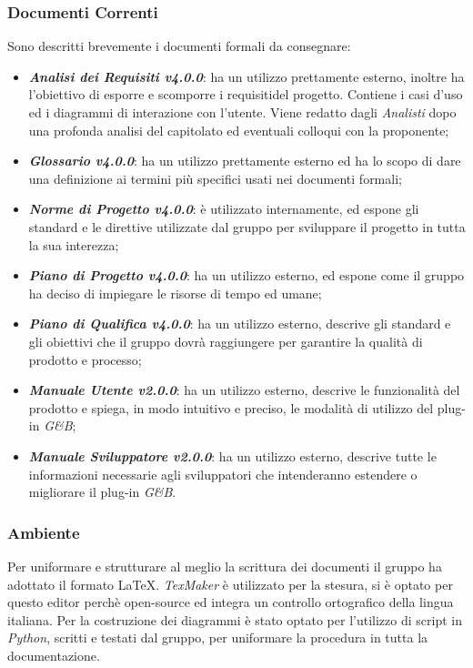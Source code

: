 \subsubsection{Documenti Correnti}
\label{ProcessiSupporto_Documentazione_DocumentiCorrenti}
Sono descritti brevemente i documenti formali da consegnare:
\begin{itemize}
	\item \textbf{\textit{Analisi dei Requisiti v4.0.0}}: ha un utilizzo prettamente esterno, inoltre ha l'obiettivo di esporre e scomporre i requisiti\glossario del progetto. Contiene i casi d'uso ed i diagrammi di interazione con l'utente. Viene redatto dagli \textit{Analisti} dopo una profonda analisi del capitolato ed eventuali colloqui con la proponente;
	\item \textbf{\textit{Glossario v4.0.0}}: ha un utilizzo prettamente esterno ed ha lo scopo di dare una definizione ai termini più specifici usati nei documenti formali;
	\item \textbf{\textit{Norme di Progetto v4.0.0}}: è utilizzato internamente, ed espone gli standard e le direttive utilizzate dal gruppo per sviluppare il progetto in tutta la sua interezza;
	\item \textbf{\textit{Piano di Progetto v4.0.0}}: ha un utilizzo esterno, ed espone come il gruppo ha deciso di impiegare le risorse di tempo ed umane;
	\item \textbf{\textit{Piano di Qualifica v4.0.0}}: ha un utilizzo esterno, descrive gli standard e gli obiettivi che il gruppo dovrà raggiungere per garantire la qualità di prodotto e processo;
	\item \textbf{\textit{Manuale Utente v2.0.0}}: ha un utilizzo esterno, descrive le funzionalità del prodotto e spiega, in modo intuitivo e preciso, le modalità di utilizzo del plug-in \textit{G\&B};
	\item \textbf{\textit{Manuale Sviluppatore v2.0.0}}: ha un utilizzo esterno, descrive tutte le informazioni necessarie agli sviluppatori che intenderanno estendere o migliorare il plug-in \textit{G\&B}.
\end{itemize}

\subsubsection{Ambiente}\label{ProcessiSupporto_Documentazione_Ambiente}
Per uniformare e strutturare al meglio la scrittura dei documenti il gruppo ha adottato il formato \LaTeX.
\textit{TexMaker} è utilizzato per la stesura, si è optato per questo editor perchè open-source ed integra un controllo ortografico della lingua italiana.
Per la costruzione dei diagrammi è stato optato per l'utilizzo di script in \textit{Python}, scritti e testati dal gruppo, per uniformare la procedura in tutta la documentazione.

